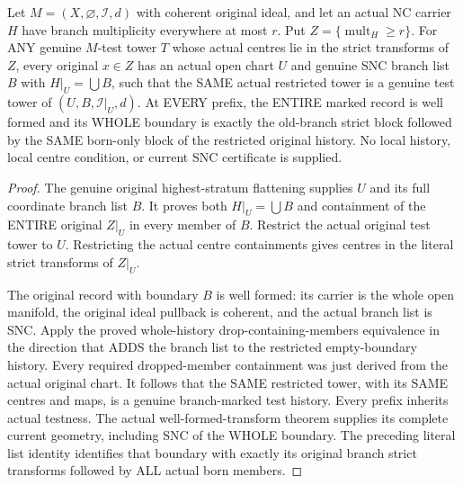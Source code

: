\begin{theorem}
\label{hir:nc-highest-stratum-actual-local-branch-histories}
\leanok
Let $M=(X,\varnothing,\mathcal I,d)$ with coherent original ideal, and let an
actual NC carrier $H$ have branch multiplicity everywhere at most $r$.
Put $Z=\{\operatorname{mult}_H\ge r\}$. For ANY genuine $M$-test tower $T$
whose actual centres lie in the strict transforms of $Z$, every original
$x\in Z$ has an actual open chart $U$ and genuine SNC branch list $B$ with
$H|_U=\bigcup B$, such that the SAME actual restricted tower is a genuine test
tower of $(U,B,\mathcal I|_U,d)$. At EVERY prefix, the ENTIRE marked record is
well formed and its WHOLE boundary is exactly the old-branch strict block
followed by the SAME born-only block of the restricted original history.
No local history, local centre condition, or current SNC certificate is supplied.
\end{theorem}
\begin{proof}
The genuine original highest-stratum flattening supplies $U$ and its full
coordinate branch list $B$. It proves both $H|_U=\bigcup B$ and containment
of the ENTIRE original $Z|_U$ in every member of $B$. Restrict the actual
original test tower to $U$. Restricting the actual centre containments gives
centres in the literal strict transforms of $Z|_U$.

The original record with boundary $B$ is well formed: its carrier is the whole
open manifold, the original ideal pullback is coherent, and the actual branch
list is SNC. Apply the proved whole-history drop-containing-members equivalence
in the direction that ADDS the branch list to the restricted empty-boundary
history. Every required dropped-member containment was just derived from the
actual original chart. It follows that the SAME restricted tower, with its
SAME centres and maps, is a genuine branch-marked test history. Every prefix
inherits actual testness. The actual well-formed-transform theorem supplies
its complete current geometry, including SNC of the WHOLE boundary. The
preceding literal list identity identifies that boundary with exactly its
original branch strict transforms followed by ALL actual born members.
\end{proof}

